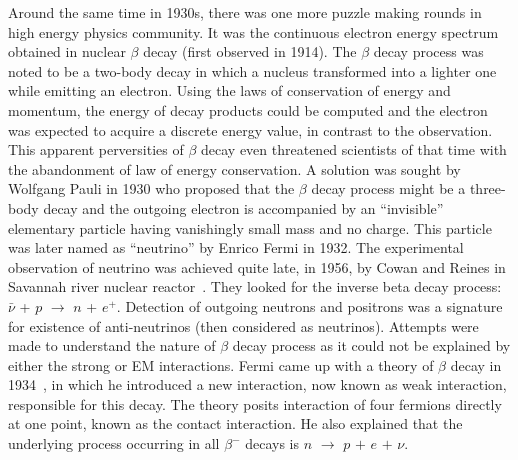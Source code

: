 Around the same time in 1930s, there was one more puzzle making rounds in high energy physics community. It was the continuous electron
energy spectrum obtained in nuclear $\beta$ decay (first observed in 1914).
The $\beta$ decay process was noted to be a two-body decay in which a nucleus transformed into a lighter one
while emitting an electron. Using the laws of conservation of energy and momentum, the energy of decay products could be computed and the electron was expected
to acquire a discrete energy value, in contrast to the observation. This apparent perversities of $\beta$ decay even
threatened scientists of that time with the abandonment of law of energy conservation. A solution was sought by Wolfgang Pauli in 1930 who proposed that
the $\beta$ decay process might be a three-body decay and the outgoing electron is accompanied by an ``invisible'' elementary particle having
vanishingly small mass and no charge. This particle was later named as ``neutrino'' by Enrico Fermi in 1932. The experimental observation of neutrino was
achieved quite late, in 1956, by Cowan and Reines in Savannah river nuclear reactor~\cite{Cowan:1992xc}. They looked for the inverse beta decay process:
$\bar{\nu}$ + $p$ $\rightarrow$ $n$ + $e^{+}$. Detection of outgoing neutrons and positrons was a signature for existence of anti-neutrinos (then considered as neutrinos).
Attempts were made to understand the nature of $\beta$ decay process as it could not be explained by either the strong or EM interactions. Fermi came up with
a theory of $\beta$ decay in 1934~\cite{Fermi1934}, in which he introduced a new interaction, now known as weak interaction, responsible for this decay. 
The theory posits interaction of four fermions directly at one point, known as the contact interaction. He also explained that the underlying process
occurring in all $\beta^{-}$ decays is $n$ $\rightarrow$ $p$ $+$ $e$ $+$ $\nu$. 

